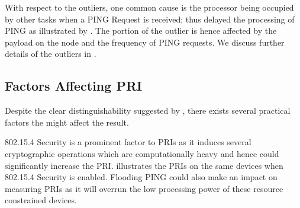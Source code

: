 With respect to the outliers, one common cause is the processor being occupied by other tasks when a PING Request is received; thus delayed the processing of PING as illustrated by . The portion of the outlier is hence affected by the payload on the node and the frequency of PING requests. We discuss further details of the outliers in .


\subsection{Factors Affecting PRI} \label{PingDevice}

Despite the clear distinguishability suggested by , there exists several practical factors the might affect the result.

802.15.4 Security\cite{802154} is a prominent factor to PRIs as it induces several cryptographic operations which are computationally heavy and hence could significantly increase the PRI.  illustrates the PRIs on the same devices when 802.15.4 Security is enabled. Flooding PING could also make an impact on measuring PRIs as it will overrun the low processing power of these resource constrained devices.

